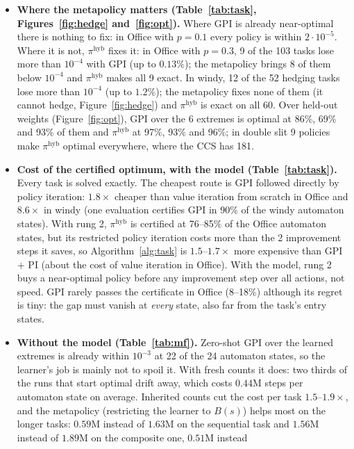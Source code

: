 \documentclass[11pt]{article}
\begin{document}
\begin{itemize}\setlength\itemsep{2pt}
\item \textbf{Where the metapolicy matters (Table~\ref{tab:task}, Figures~\ref{fig:hedge} and~\ref{fig:opt}).} Where
GPI is already near-optimal there is nothing to fix: in Office with $p=0.1$ every policy is within $2\cdot10^{-5}$.
Where it is not, $\pi^{\mathrm{hyb}}$ fixes it: in Office with $p=0.3$, 9 of the 103 tasks lose more than $10^{-4}$
with GPI (up to $0.13\%$); the metapolicy brings 8 of them below $10^{-4}$ and $\pi^{\mathrm{hyb}}$ makes all 9 exact.
In windy, 12 of the 52 hedging tasks lose more than $10^{-4}$ (up to $1.2\%$); the metapolicy fixes none of them (it
cannot hedge, Figure~\ref{fig:hedge}) and $\pi^{\mathrm{hyb}}$ is exact on all 60. Over held-out weights (Figure~\ref{fig:opt}), GPI over the 6 extremes is
optimal at 86\%, 69\% and 93\% of them and $\pi^{\mathrm{hyb}}$ at 97\%, 93\% and 96\%; in double slit 9 policies
make $\pi^{\mathrm{hyb}}$ optimal everywhere, where the CCS has 181.
\item \textbf{Cost of the certified optimum, with the model (Table~\ref{tab:task}).} Every task is solved exactly.
The cheapest route is GPI followed directly by policy iteration: $1.8\times$ cheaper than value iteration from scratch
in Office and $8.6\times$ in windy (one evaluation certifies GPI in 90\% of the windy automaton states). With rung 2,
$\pi^{\mathrm{hyb}}$ is certified at 76--85\% of the Office automaton states, but its restricted policy iteration costs
more than the 2 improvement steps it saves, so Algorithm~\ref{alg:task} is $1.5$--$1.7\times$ more expensive than GPI
+ PI (about the cost of value iteration in Office). With the model, rung 2 buys a near-optimal policy before any
improvement step over all actions, not speed. GPI rarely passes the certificate in Office (8--18\%) although its
regret is tiny: the gap must vanish at \emph{every} state, also far from the task's entry states.
\item \textbf{Without the model (Table~\ref{tab:mf}).} Zero-shot GPI over the learned extremes is already within
$10^{-3}$ at 22 of the 24 automaton states, so the learner's job is mainly not to spoil it. With fresh counts it does:
two thirds of the runs that start optimal drift away, which costs $0.44$M steps per automaton state on average.
Inherited counts cut the cost per task $1.5$--$1.9\times$, and the metapolicy (restricting the learner to $B(s)$) helps most on the longer tasks:
$0.59$M instead of $1.63$M on the sequential task and $1.56$M instead of $1.89$M on the composite one, $0.51$M instead

\end{itemize}
\end{document}
